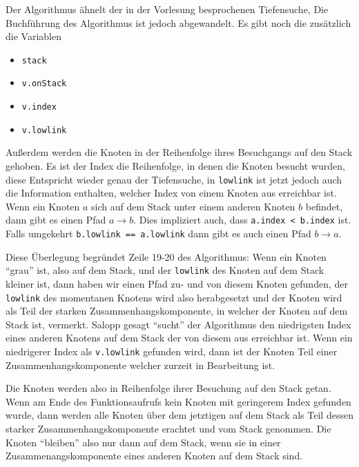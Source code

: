 \documentclass[11pt]{article}
\begin{document}
\begin{enumerate}[a)]
        Der Algorithmus \"ahnelt der in der Vorlesung besprochenen Tiefensuche,
        Die Buchf\"uhrung des Algorithmus ist jedoch abgewandelt. Es gibt noch
        die zus\"atzlich die Variablen
        \begin{itemize}
          \item \texttt{stack}
          \item \texttt{v.onStack}
          \item \texttt{v.index}
          \item \texttt{v.lowlink}
        \end{itemize}
        Au\ss{}erdem werden die Knoten in der Reihenfolge ihres Besuchgangs auf
        den Stack gehoben. Es ist der Index die Reihenfolge, in denen die
        Knoten besucht wurden, diese Entspricht wieder genau der Tiefensuche,
        in \texttt{lowlink} ist jetzt jedoch auch die Information enthalten,
        welcher Index von einem Knoten aus erreichbar ist. Wenn ein Knoten $a$
        sich auf dem Stack unter einem anderen Knoten $b$ befindet, dann gibt
        es einen Pfad $a \to b$. Dies impliziert auch, dass \texttt{a.index <
        b.index} ist.  Falls umgekehrt \texttt{b.lowlink  == a.lowlink} dann
        gibt es auch einen Pfad $b \to a$.

        Diese \"Uberlegung begr\"undet Zeile 19-20 des Algorithmus: Wenn
        ein Knoten ``grau'' ist, also auf dem Stack, und der \texttt{lowlink}
        des Knoten auf dem Stack kleiner ist, dann haben wir einen Pfad zu-
        und von diesem Knoten gefunden, der \texttt{lowlink} des 
        momentanen Knotens wird also herabgesetzt und der Knoten wird
        als Teil der starken Zusammenhangskomponente, in welcher der Knoten
        auf dem Stack ist, vermerkt. Salopp gesagt ``sucht'' der Algorithmus
        den niedrigsten Index eines anderen Knotens auf dem Stack der von
        diesem aus erreichbar ist. Wenn ein niedrigerer Index als
        \texttt{v.lowlink} gefunden wird, dann ist der Knoten Teil einer
        Zusammenhangskomponente welcher zurzeit in Bearbeitung ist.

        Die Knoten werden also in Reihenfolge ihrer Besuchung auf den Stack
        getan. Wenn am Ende des Funktionsaufrufs kein Knoten mit
        geringerem Index gefunden wurde, dann werden alle Knoten \"uber
        dem jetztigen auf dem Stack als Teil dessen starker
        Zusammenhangskomponente erachtet und vom Stack genommen. Die Knoten
        ``bleiben'' also nur dann auf dem Stack, wenn sie in einer
        Zusammenangskomponente eines anderen Knoten auf dem Stack sind.
        

\end{enumerate}
\end{document}
